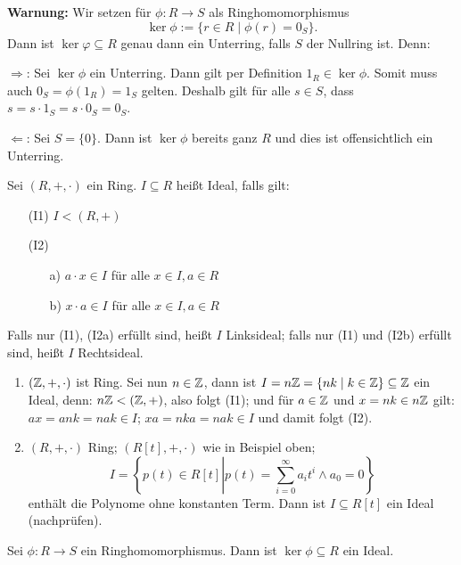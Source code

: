 \documentclass[12pt,a4paper]{scrartcl}
\begin{document}
\noindent
\textbf{Warnung:} Wir setzen für $\phi\colon R\to S$ als Ringhomomorphismus
\[\ker\phi := \{r\in R\mid\phi(r)= 0_S\}.\] Dann ist $\ker\varphi\subseteq R$ genau dann ein Unterring, falls $S$ der Nullring ist. Denn:

\glqq $\Rightarrow$\grqq: Sei $\ker\phi$ ein Unterring. Dann gilt per Definition $1_R\in \ker \phi$. Somit muss auch $0_S = \phi (1_R) = 1_S$ gelten. Deshalb gilt für alle $s\in S$, dass $s = s\cdot 1_S = s\cdot 0_S = 0_S$.

\glqq $\Leftarrow$\grqq: Sei $S = \{0\}$. Dann ist $\ker\phi$ bereits ganz $R$ und dies ist offensichtlich ein Unterring.

\begin{defi}
	Sei $(R,+,\cdot)$ ein Ring. $I\subseteq R$ heißt Ideal, falls gilt:
	\begin{itemize}
		\item[(I1)] $I<(R,+)$
		\item[(I2)] \begin{itemize}
			\item[a)] $a\cdot x \in I$ für alle $x\in I, a\in R$
			\item[b)] $x\cdot a \in I$ für alle $x\in I, a\in R$
		\end{itemize}
	\end{itemize}
	Falls nur (I1), (I2a) erfüllt sind, heißt $I$ Linksideal; falls nur (I1) und (I2b) erfüllt sind, heißt $I$ Rechtsideal.
\end{defi}

\begin{bsp} \label{bsp:rt_r}
	\leavevmode
	\begin{enumerate}
		\item $(\mathbb Z,+,\cdot)$ ist Ring. Sei nun $n\in\mathbb Z$, dann ist $I= n\mathbb Z = \{nk\mid k\in\mathbb Z\}\subseteq \mathbb Z$ ein Ideal, denn: $n\mathbb Z<(\mathbb Z,+)$, also folgt (I1); und für $a\in\mathbb Z$ und $x = nk\in n\mathbb Z$ gilt: $ax = ank = nak\in I$; $xa = nka  = nak \in I$ und damit folgt (I2).
		
		\item $(R,+,\cdot)$ Ring; $(R[t],+,\cdot)$ wie in Beispiel oben; \[I = \left\{p(t)\in R[t]\left| p(t) = \sum_{i = 0}^{\infty}a_it^i \wedge a_0 = 0\right.\right\}\] enthält die Polynome ohne konstanten Term. Dann ist $I\subseteq R[t]$ ein Ideal (nachprüfen).
	\end{enumerate}
\end{bsp}


\begin{lem} \label{lem:kerid_r}
	Sei $\phi\colon R\to S$ ein Ringhomomorphismus. Dann ist $\ker\phi \subseteq R$ ein Ideal.
\end{lem}
\end{document}
